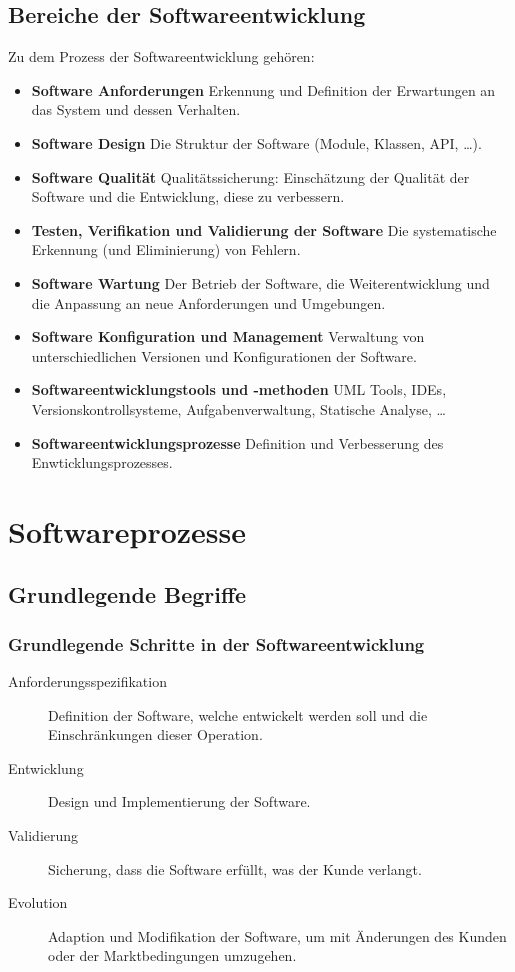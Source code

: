 \documentclass[a4paper, 11pt, accentcolor = tud3b]{tudreport}
\begin{document}
		\section{Bereiche der Softwareentwicklung}
			Zu dem Prozess der Softwareentwicklung gehören:
			\begin{itemize}
				\item \textbf{Software Anforderungen} Erkennung und Definition der Erwartungen an das System und dessen Verhalten.
				\item \textbf{Software Design} Die Struktur der Software (Module, Klassen, API, \dots).
				\item \textbf{Software Qualität} Qualitätssicherung: Einschätzung der Qualität der Software und die Entwicklung, diese zu verbessern.
				\item \textbf{Testen, Verifikation und Validierung der Software} Die systematische Erkennung (und Eliminierung) von Fehlern.
				\item \textbf{Software Wartung} Der Betrieb der Software, die Weiterentwicklung und die Anpassung an neue Anforderungen und Umgebungen.
				\item \textbf{Software Konfiguration und Management} Verwaltung von unterschiedlichen Versionen und Konfigurationen der Software.
				\item \textbf{Softwareentwicklungstools und -methoden} UML Tools, IDEs, Versionskontrollsysteme, Aufgabenverwaltung, Statische Analyse, \dots
				\item \textbf{Softwareentwicklungsprozesse} Definition und Verbesserung des Enwticklungsprozesses.
			\end{itemize}
	
	\chapter{Softwareprozesse}
		\section{Grundlegende Begriffe}
			\subsection{Grundlegende Schritte in der Softwareentwicklung}
				\begin{description}
					\item[Anforderungsspezifikation] Definition der Software, welche entwickelt werden soll und die Einschränkungen dieser Operation.
					\item[Entwicklung] Design und Implementierung der Software.
					\item[Validierung] Sicherung, dass die Software erfüllt, was der Kunde verlangt.
					\item[Evolution] Adaption und Modifikation der Software, um mit Änderungen des Kunden oder der Marktbedingungen umzugehen.
				\end{description}
	
\end{document}

